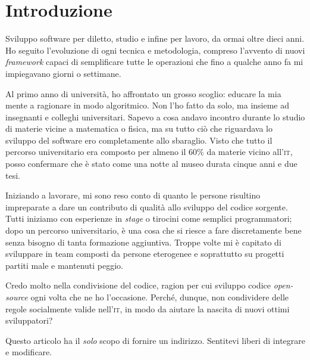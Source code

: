 \section{Introduzione}

Sviluppo software per diletto, studio e infine per lavoro, da ormai oltre dieci anni. Ho seguito l’evoluzione di ogni tecnica e metodologia, compreso l’avvento di nuovi \emph{framework} capaci di semplificare tutte le operazioni che fino a qualche anno fa mi impiegavano giorni o settimane.

Al primo anno di università, ho affrontato un grosso scoglio: educare la mia mente a ragionare in modo algoritmico. Non l’ho fatto da solo, ma insieme ad insegnanti e colleghi universitari. Sapevo a cosa andavo incontro durante lo studio di materie vicine a matematica o fisica, ma su tutto ciò che riguardava lo sviluppo del software ero completamente allo sbaraglio. Visto che tutto il percorso universitario era composto per almeno il 60\% da materie vicino all’\textsc{it}, posso confermare che è stato come una notte al museo durata cinque anni e due tesi.

Iniziando a lavorare, mi sono reso conto di quanto le persone risultino impreparate a dare un contributo di qualità allo sviluppo del codice sorgente. Tutti iniziamo con esperienze in \emph{stage} o tirocini come semplici programmatori; dopo un percorso universitario, è una cosa che si riesce a fare discretamente bene senza bisogno di tanta formazione aggiuntiva. Troppe volte mi è capitato di sviluppare in team composti da persone eterogenee e soprattutto su progetti partiti male e mantenuti peggio.

Credo molto nella condivisione del codice, ragion per cui sviluppo codice \emph{open-source} ogni volta che ne ho l’occasione. Perché, dunque, non condividere delle regole socialmente valide nell’\textsc{it}, in modo da aiutare la nascita di nuovi ottimi sviluppatori?

Questo articolo ha il \emph{solo} scopo di fornire un indirizzo. Sentitevi liberi di integrare e modificare.